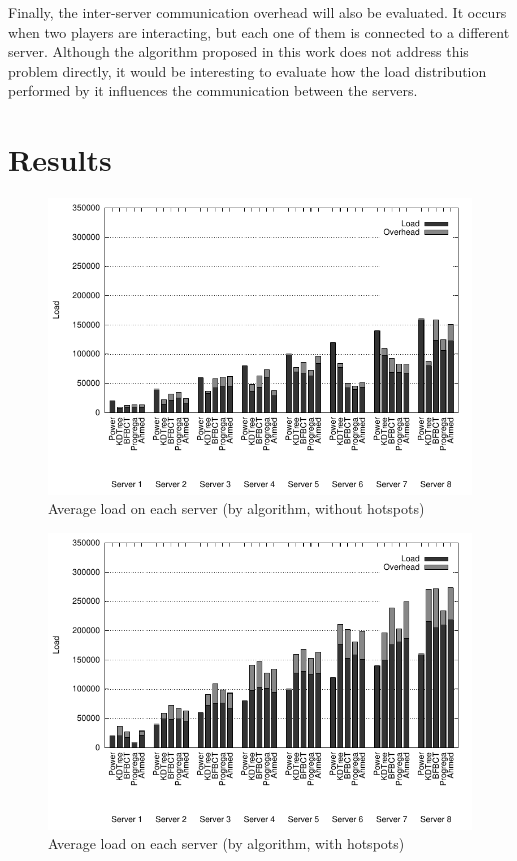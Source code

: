 \documentclass[acmtocl]{acmtrans2m}
\begin{document}
Finally, the inter-server communication overhead will also be evaluated. It occurs when two players are interacting, but each one of them is connected to a different server. Although the algorithm proposed in this work does not address this problem directly, it would be interesting to evaluate how the load distribution performed by it influences the communication between the servers.

\section{Results}
\label{sec:result}

\begin{figure}[!t]
	\centering
	\includegraphics[width=\linewidth]{images/distribution_uniform}
	\caption{Average load on each server (by algorithm, without hotspots)}
	\label{fig:distribution:uniform}
\end{figure}

\begin{figure}[!t]
	\centering
	\includegraphics[width=\linewidth]{images/distribution_hotspots}
	\caption{Average load on each server (by algorithm, with hotspots)}
	\label{fig:distribution:hotspots}
\end{figure}
\end{document}
